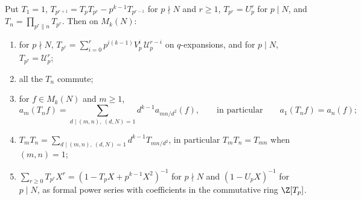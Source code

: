 \begin{theorem}\label{thm:hecke:Tn}
Put $T_1=1$, $T_{p^{r+1}}=T_pT_{p^r}-p^{k-1}T_{p^{r-1}}$ for $p\nmid N$ and $r\ge1$, $T_{p^r}=U_p^r$ for $p\mid N$, and $T_n=\prod_{p^r\|n}T_{p^r}$. Then on $M_k(N)$:
\begin{enumerate}[label=(\roman*)]
\item for $p\nmid N$, $T_{p^r}=\sum_{i=0}^rp^{i(k-1)}V_p^i\,\mathcal U_p^{r-i}$ on $q$-expansions, and for $p\mid N$, $T_{p^r}=\mathcal U_p^r$;
\item all the $T_n$ commute;
\item for $f\in M_k(N)$ and $m\ge1$,
\[
a_m(T_nf)=\sum_{d\mid(m,n),\ (d,N)=1}d^{k-1}a_{mn/d^2}(f),\qquad\text{in particular}\qquad a_1(T_nf)=a_n(f);
\]
\item $T_mT_n=\sum_{d\mid(m,n),\ (d,N)=1}d^{k-1}T_{mn/d^2}$, in particular $T_mT_n=T_{mn}$ when $(m,n)=1$;
\item $\sum_{r\ge0}T_{p^r}X^r=(1-T_pX+p^{k-1}X^2)^{-1}$ for $p\nmid N$ and $(1-U_pX)^{-1}$ for $p\mid N$, as formal power series with coefficients in the commutative ring $\Z[T_p]$.
\end{enumerate}
\end{theorem}

